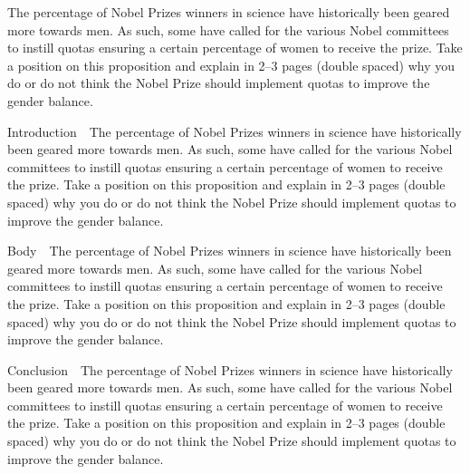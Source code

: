 \noindent
The percentage of Nobel Prizes winners in science have historically been geared more towards men. As such, some have called for the various Nobel committees to instill quotas ensuring a certain percentage of women to receive the prize. Take a position on this proposition and explain in 2–3 pages (double spaced) why you do or do not think the Nobel Prize should implement quotas to improve the gender balance.

\par
Introduction~\cite{doublebind}~The percentage of Nobel Prizes winners in science have historically been geared more towards men. As such, some have called for the various Nobel committees to instill quotas ensuring a certain percentage of women to receive the prize. Take a position on this proposition and explain in 2–3 pages (double spaced) why you do or do not think the Nobel Prize should implement quotas to improve the gender balance.

\par
Body~\cite{doublebind}~The percentage of Nobel Prizes winners in science have historically been geared more towards men. As such, some have called for the various Nobel committees to instill quotas ensuring a certain percentage of women to receive the prize. Take a position on this proposition and explain in 2–3 pages (double spaced) why you do or do not think the Nobel Prize should implement quotas to improve the gender balance.

\par
Conclusion~\cite{doublebind}~The percentage of Nobel Prizes winners in science have historically been geared more towards men. As such, some have called for the various Nobel committees to instill quotas ensuring a certain percentage of women to receive the prize. Take a position on this proposition and explain in 2–3 pages (double spaced) why you do or do not think the Nobel Prize should implement quotas to improve the gender balance.